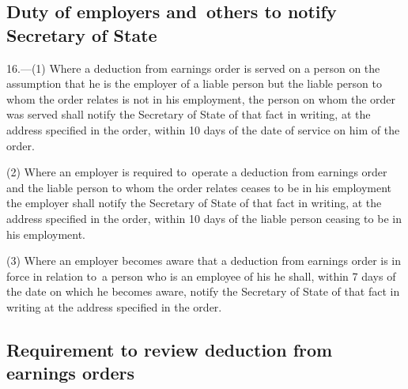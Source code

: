 \documentclass[12pt,a4paper]{article}
\begin{document}
\subsection[16. Duty of employers and~others to notify Secretary of State]{Duty of employers and~others to notify Secretary of State}

16.—(1) Where a deduction from earnings order is served on a person on the assumption that he is the employer of a liable person but the liable person to whom the order relates is not in his employment, the person on whom the order was served shall notify the Secretary of State of that fact in writing, at the address specified in the order, within 10 days of the date of service on him of the order.

(2) Where an employer is required to~operate a deduction from earnings order and the liable person to whom the order relates ceases to be in his employment the employer shall notify the Secretary of State of that fact in writing, at the address specified in the order, within 10 days of the liable person ceasing to be in his employment.

(3) Where an employer becomes aware that a deduction from earnings order is in force in relation to~a person who is an employee of his he shall, within 7 days of the date on which he becomes aware, notify the Secretary of State of that fact in writing at the address specified in the order.

\subsection[17. Requirement to review deduction from earnings orders]{Requirement to review deduction from earnings orders}

%
\end{document}
